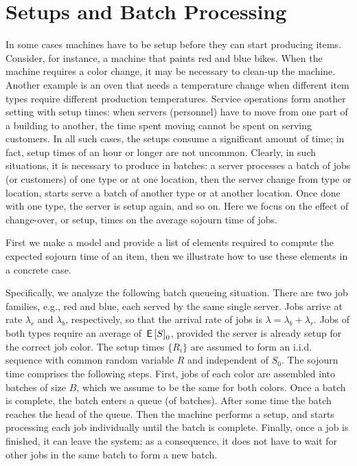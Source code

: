 \section{Setups and Batch Processing}
\label{sec:setups-batch-proc}

In some cases machines have to be setup before they can start producing items.
Consider, for instance, a machine that paints red and blue bikes.
When the machine requires a color change, it may be necessary to clean-up the machine.
Another example is an oven that needs a temperature change when different item types require different production temperatures.
Service operations form another setting with setup times: when servers (personnel) have to move from one part of a building to another, the time spent moving cannot be spent on serving customers.
In all such cases, the setups consume a significant amount of time; in fact, setup times of an hour or longer are not uncommon.
Clearly, in such situations, it is necessary to produce in batches: a server processes a batch of jobs (or customers) of one type or at one location, then the server change from type or location, starts serve a batch of another type or at another location.
Once done with one type, the server is setup again, and so on.
Here we focus on the effect of change-over, or setup, times on the average sojourn time of jobs.

First we make a model and provide a list of elements required to compute the expected sojourn time of an item, then we illustrate how to use these elements in a concrete case.




Specifically, we analyze the following batch queueing situation.
There are two job families, e.g., red and blue, each served by the same single server.
Jobs arrive at rate $\lambda_r$ and $\lambda_b$, respectively, so that the arrival rate of jobs is $\lambda= \lambda_b+\lambda_r$.
Jobs of both types require an average  of $\,\mathsf{E}\left[S\right]_0$, provided the server is already setup for the correct job color.
The setup times $\{R_i\}$ are assumed to form an i.i.d.
sequence with common random variable $R$ and independent of $S_0$.
The sojourn time comprises the following steps.
First, jobs of each color are assembled into batches of size $B$, which we assume to be the same for both colors.
Once a batch is complete, the batch enters a queue (of batches).
After some time the batch reaches the head of the queue.
Then the machine performs a setup, and starts processing each job individually until the batch is complete.
Finally, once a job is finished, it can leave the system; as a consequence, it does not have to wait for other jobs in the same batch to form a new batch.




